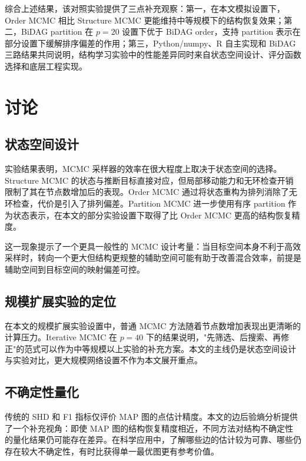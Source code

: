 \documentclass[UTF8,a4paper,12pt]{ctexart}
\begin{document}
综合上述结果，该对照实验提供了三点补充观察：第一，在本文模拟设置下，Order MCMC 相比 Structure MCMC 更能维持中等规模下的结构恢复效果；第二，BiDAG partition 在 $p=20$ 设置下优于 BiDAG order，支持 partition 表示在部分设置下缓解排序偏差的作用；第三，Python/numpy、R 自主实现和 BiDAG 三路结果共同说明，结构学习实验中的性能差异同时来自状态空间设计、评分函数选择和底层工程实现。

\newpage
\section{讨论}

\subsection{状态空间设计}

实验结果表明，MCMC 采样器的效率在很大程度上取决于状态空间的选择。Structure MCMC 的状态与推断目标直接对应，但局部移动能力和无环检查开销限制了其在节点数增加后的表现。Order MCMC 通过将状态重构为排列消除了无环检查，代价是引入了排列偏差。Partition MCMC 进一步使用有序 partition 作为状态表示，在本文的部分实验设置下取得了比 Order MCMC 更高的结构恢复精度。

这一现象提示了一个更具一般性的 MCMC 设计考量：当目标空间本身不利于高效采样时，转向一个更大但结构更规整的辅助空间可能有助于改善混合效率，前提是辅助空间到目标空间的映射偏差可控。

\subsection{规模扩展实验的定位}

在本文的规模扩展实验设置中，普通 MCMC 方法随着节点数增加表现出更清晰的计算压力。Iterative MCMC 在 $p=40$ 下的结果说明，"先筛选、后搜索、再修正"的范式可以作为中等规模以上实验的补充方案。本文的主线仍是状态空间设计与实验对比，更大规模网络设置不作为本文展开重点。

\subsection{不确定性量化}

传统的 SHD 和 F1 指标仅评价 MAP 图的点估计精度。本文的边后验熵分析提供了一个补充视角：即使 MAP 图的结构恢复精度相近，不同方法对结构不确定性的量化结果仍可能存在差异。在科学应用中，了解哪些边的估计较为可靠、哪些仍存在较大不确定性，有时比获得单一最优图更有参考价值。
\end{document}
